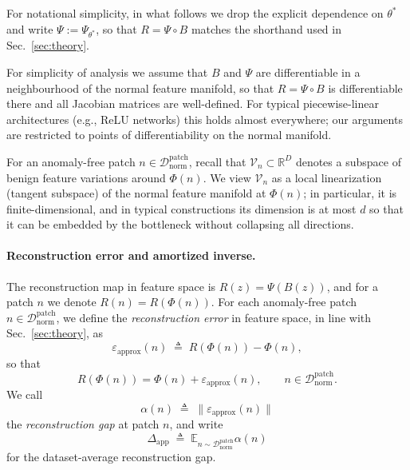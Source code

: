 \documentclass{article}
\theoremstyle{plain}
\theoremstyle{definition}
\theoremstyle{remark}
\begin{document}
For notational simplicity, in what follows we drop the explicit
dependence on $\theta^*$ and write $\Psi := \Psi_{\theta^*}$, so that
$R = \Psi \circ B$ matches the shorthand used in
Sec.~\ref{sec:theory}.

For simplicity of analysis we assume that $B$ and $\Psi$ are
differentiable in a neighbourhood of the normal feature manifold, so
that $R = \Psi\circ B$ is differentiable there and all Jacobian matrices
are well-defined. For typical piecewise-linear architectures (e.g., ReLU
networks) this holds almost everywhere; our arguments are restricted to
points of differentiability on the normal manifold.

For an anomaly-free patch $n\in\mathcal{D}^{\mathrm{patch}}_{\mathrm{norm}}$,
recall that $\mathcal{V}_n\subset\mathbb{R}^D$ denotes a subspace of
benign feature variations around $\Phi(n)$. We view
$\mathcal{V}_n$ as a local linearization (tangent subspace) of the
normal feature manifold at $\Phi(n)$; in particular, it is
finite-dimensional, and in typical constructions its dimension is at
most $d$ so that it can be embedded by the bottleneck without collapsing
all directions.

\paragraph{Reconstruction error and amortized inverse.}
The reconstruction map in feature space is
$R(z) = \Psi(B(z))$, and for a patch $n$ we denote
$R(n) = R(\Phi(n))$. For each anomaly-free patch
$n\in\mathcal{D}^{\mathrm{patch}}_{\mathrm{norm}}$, we define the
\emph{reconstruction error} in feature space, in line with
Sec.~\ref{sec:theory}, as
\begin{equation}
    \varepsilon_{\mathrm{approx}}(n)
    \;\triangleq\;
    R(\Phi(n)) - \Phi(n),
\end{equation}
so that
\begin{equation}
    R(\Phi(n)) = \Phi(n) + \varepsilon_{\mathrm{approx}}(n),
    \qquad n \in \mathcal{D}_{\mathrm{norm}}^{\mathrm{patch}}.
\end{equation}
We call
\begin{equation}
    \alpha(n)\;\triangleq\;\big\|\varepsilon_{\mathrm{approx}}(n)\big\|
\end{equation}
the \emph{reconstruction gap} at patch $n$, and write
\begin{equation}
    \Delta_{\mathrm{app}}
    \;\triangleq\;
    \mathbb{E}_{n \sim
    \mathcal{D}^{\mathrm{patch}}_{\mathrm{norm}}} \alpha(n)
\end{equation}
for the dataset-average reconstruction gap.
\end{document}
